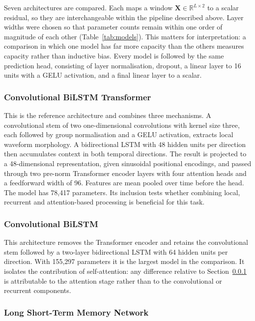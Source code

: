 Seven architectures are compared. Each maps a window
$\mathbf{X} \in \mathbb{R}^{L \times 2}$ to a scalar residual, so they are
interchangeable within the pipeline described above. Layer widths were chosen so
that parameter counts remain within one order of magnitude of each other
(Table~\ref{tab:models}). This matters for interpretation: a comparison in which
one model has far more capacity than the others measures capacity rather than
inductive bias. Every model is followed by the same prediction head, consisting
of layer normalisation, dropout, a linear layer to 16 units with a GELU
activation, and a final linear layer to a scalar.

\subsubsection{Convolutional BiLSTM Transformer}
\label{sec:cbt}

This is the reference architecture and combines three mechanisms. A
convolutional stem of two one-dimensional convolutions with kernel size three,
each followed by group normalisation and a GELU activation, extracts local
waveform morphology. A bidirectional LSTM with 48 hidden units per direction then
accumulates context in both temporal directions. The result is projected to a
48-dimensional representation, given sinusoidal positional encodings, and passed
through two pre-norm Transformer encoder layers with four attention heads and a
feedforward width of 96. Features are mean pooled over time before the head. The
model has 78{,}417 parameters. Its inclusion tests whether combining local,
recurrent and attention-based processing is beneficial for this task.

\subsubsection{Convolutional BiLSTM}
\label{sec:cbl}

This architecture removes the Transformer encoder and retains the convolutional
stem followed by a two-layer bidirectional LSTM with 64 hidden units per
direction. With 155{,}297 parameters it is the largest model in the comparison.
It isolates the contribution of self-attention: any difference relative to
Section~\ref{sec:cbt} is attributable to the attention stage rather than to the
convolutional or recurrent components.

\subsubsection{Long Short-Term Memory Network}
\label{sec:lstm}

